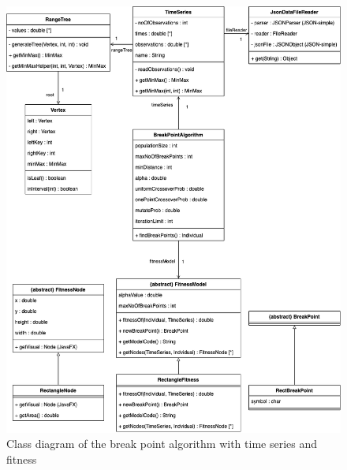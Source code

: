 \begin{figure}[ht]
    \centering
    \includegraphics[width=.8\textwidth]{fig/class-diagram-algorithm.png}
    \caption{Class diagram of the break point algorithm with time series and fitness}
    \label{fig:class-diagram-algorithm}
\end{figure}
